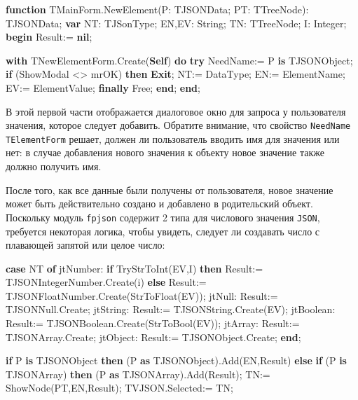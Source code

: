 \documentclass[
]{article}
\newenvironment{Shaded}{}{}
\newcommand{\DataTypeTok}[1]{\textcolor[rgb]{0.56,0.13,0.00}{#1}}
\newcommand{\KeywordTok}[1]{\textcolor[rgb]{0.00,0.44,0.13}{\textbf{#1}}}
\newcommand{\NormalTok}[1]{#1}
\begin{document}
\begin{Shaded}
\begin{Highlighting}[]
\KeywordTok{function}\NormalTok{ TMainForm.NewElement(P: TJSONData; PT: TTreeNode): TJSONData;}
\KeywordTok{var}
\NormalTok{  NT: TJSonType;}
\NormalTok{  EN,EV: }\DataTypeTok{String}\NormalTok{;}
\NormalTok{  TN: TTreeNode;}
\NormalTok{  I: }\DataTypeTok{Integer}\NormalTok{;}
\KeywordTok{begin}
\NormalTok{  Result:= }\KeywordTok{nil}\NormalTok{;}

  \KeywordTok{with}\NormalTok{ TNewElementForm.Create(}\KeywordTok{Self}\NormalTok{) }\KeywordTok{do}
  \KeywordTok{try}
\NormalTok{    NeedName:= P }\KeywordTok{is}\NormalTok{ TJSONObject;}
    \KeywordTok{if}\NormalTok{ (ShowModal \textless{}\textgreater{} mrOK) }\KeywordTok{then} \KeywordTok{Exit}\NormalTok{;}
\NormalTok{    NT:= DataType;}
\NormalTok{    EN:= ElementName;}
\NormalTok{    EV:= ElementValue;}
  \KeywordTok{finally}
\NormalTok{    Free;}
  \KeywordTok{end}\NormalTok{;}
\KeywordTok{end}\NormalTok{;}
\end{Highlighting}
\end{Shaded}

В этой первой части отображается диалоговое окно для запроса у
пользователя значения, которое следует добавить. Обратите внимание, что
свойство \texttt{NeedName} \texttt{TElementForm} решает, должен ли
пользователь вводить имя для значения или нет: в случае добавления
нового значения к объекту новое значение также должно получить имя.

После того, как все данные были получены от пользователя, новое значение
может быть действительно создано и добавлено в родительский объект.
Поскольку модуль \texttt{fpjson} содержит 2 типа для числового значения
\texttt{JSON}, требуется некоторая логика, чтобы увидеть, следует ли
создавать число с плавающей запятой или целое число:

\begin{Shaded}
\begin{Highlighting}[]
\KeywordTok{case}\NormalTok{ NT }\KeywordTok{of}
\NormalTok{    jtNumber: }\KeywordTok{if}\NormalTok{ TryStrToInt(EV,I) }\KeywordTok{then}
\NormalTok{                Result:= TJSONIntegerNumber.Create(i)}
              \KeywordTok{else}
\NormalTok{                Result:= TJSONFloatNumber.Create(StrToFloat(EV));}
\NormalTok{      jtNull: Result:= TJSONNull.Create;}
\NormalTok{    jtString: Result:= TJSONString.Create(EV);}
\NormalTok{   jtBoolean: Result:= TJSONBoolean.Create(StrToBool(EV));}
\NormalTok{     jtArray: Result:= TJSONArray.Create;}
\NormalTok{    jtObject: Result:= TJSONObject.Create;}
    \KeywordTok{end}\NormalTok{;}

    \KeywordTok{if}\NormalTok{ P }\KeywordTok{is}\NormalTok{ TJSONObject }\KeywordTok{then}
\NormalTok{      (P }\KeywordTok{as}\NormalTok{ TJSONObject).Add(EN,Result)}
    \KeywordTok{else} \KeywordTok{if}\NormalTok{ (P }\KeywordTok{is}\NormalTok{ TJSONArray) }\KeywordTok{then}
\NormalTok{          (P }\KeywordTok{as}\NormalTok{ TJSONArray).Add(Result);}
\NormalTok{    TN:= ShowNode(PT,EN,Result);}
\NormalTok{    TVJSON.Selected:= TN;}
\end{Highlighting}
\end{Shaded}
\end{document}
